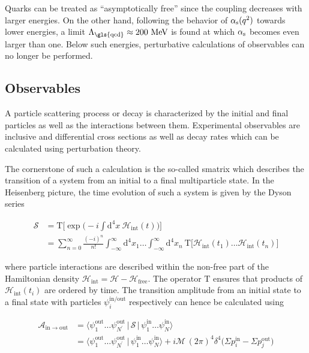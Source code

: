Quarks can be treated as ``asymptotically free'' since the coupling decreases with larger energies. On the other hand, following the behavior of ${\alpha_\mathrm{s}}(q^2)$ towards lower energies, a limit $\Lambda_\mathrm{\gls{qcd}}\approx 200~\MeV$ is found at which ${\alpha_\mathrm{s}}$ becomes even larger than one. Below such energies, perturbative calculations of observables can no longer be performed. 



\subsection{Observables}

A particle scattering process or decay is characterized by the initial and final particles as well as the interactions between them. Experimental observables are inclusive and differential cross sections as well as decay rates which can be calculated using perturbation theory. 

The cornerstone of such a calculation is the so-called \gls{smatrix} which describes the transition of a system from an initial to a final multiparticle state. In the Heisenberg picture, the time evolution of such a system is given by the Dyson series

\begin{align}
\mathcal{S}&=\mathrm{T}\Big[\exp\Big(-i\int\mathrm{d}^{4}x~\mathcal{H}_\mathrm{int}(t)\Big)\Big]\\
&=\sum_{n=0}^{\infty}\frac{(-i)^{n}}{n!}\int_{-\infty}^{\infty}\mathrm{d}^{4}x_{1}\ldots \int_{-\infty}^{\infty}\mathrm{d}^{4}x_{n}~\mathrm{T}\Big[\mathcal{H}_\mathrm{int}(t_{1})\ldots\mathcal{H}_\mathrm{int}(t_{n})\Big] \label{eq:theory-dyson-series}
\end{align}

where particle interactions are described within the non-free part of the Hamiltonian density $\mathcal{H}_\mathrm{int}=\mathcal{H}-\mathcal{H}_\mathrm{free}$. The operator $\mathrm{T}$ ensures that products of $\mathcal{H}_\mathrm{int}(t_{i})$ are ordered by time. The transition amplitude from an initial state to a final state with particles $\psi_i^\mathrm{in/out}$ respectively can hence be calculated using

\begin{align}
\mathcal{A}_\mathrm{in\to out}&=\langle\psi_{1}^\mathrm{out}\ldots\psi_{N^{\prime}}^\mathrm{out}\,|\,\mathcal{S}\,|\,\psi_{1}^\mathrm{in}\ldots\psi_{N}^\mathrm{in}\rangle \\
&=\langle\psi_{1}^\mathrm{out}\ldots\psi_{N^{\prime}}^\mathrm{out}\,|\,\psi_{1}^\mathrm{in}\ldots\psi_{N}^\mathrm{in}\rangle+i\mathcal{M}\,(2\pi)^{4}\delta^{4}\big(\Sigma p^\mathrm{in}_{i}-\Sigma p^\mathrm{out}_{j}\big)
\end{align}

